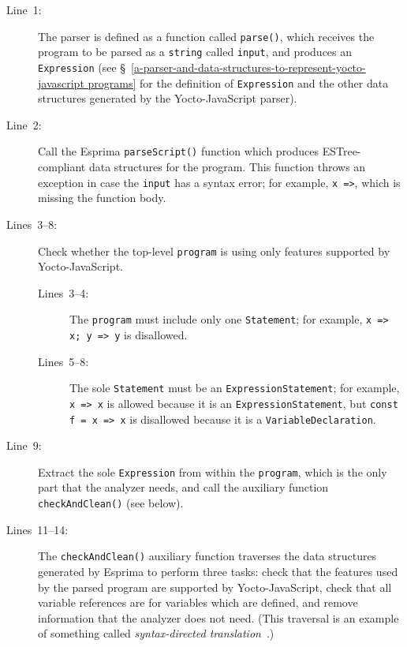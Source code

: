 \documentclass[12pt, oneside]{book}
\begin{document}
\begin{description}
\item [Line~1:]

The parser is defined as a function called \texttt{parse()}, which receives the program to be parsed as a \texttt{string} called \texttt{input}, and produces an \texttt{Expression} (see §~\ref{a-parser-and-data-structures-to-represent-yocto-javascript programs} for the definition of \texttt{Expression} and the other data structures generated by the Yocto-JavaScript parser).

\item [Line~2:]

Call the Esprima \texttt{parseScript()} function which produces ESTree-compliant data structures for the program. This function throws an exception in case the \texttt{input} has a syntax error; for example, \texttt{x =>}, which is missing the function body.

\item [Lines~3–8:]

Check whether the top-level \texttt{program} is using only features supported by Yocto-JavaScript.

\begin{description}
\item [Lines~3–4:]

The \texttt{program} must include only one \texttt{Statement}; for example, \texttt{x => x; y => y} is disallowed.

\item [Lines~5–8:]

The sole \texttt{Statement} must be an \texttt{ExpressionStatement}; for example, \texttt{x => x} is allowed because it is an \texttt{ExpressionStatement}, but \texttt{const f = x => x} is disallowed because it is a \texttt{VariableDeclaration}.
\end{description}

\item [Line~9:]

Extract the sole \texttt{Expression} from within the \texttt{program}, which is the only part that the analyzer needs, and call the auxiliary function \texttt{checkAndClean()} (see below).

\item [Lines~11–14:]

The \texttt{checkAndClean()} auxiliary function traverses the data structures generated by Esprima to perform three tasks: check that the features used by the parsed program are supported by Yocto-JavaScript, check that all variable references are for variables which are defined, and remove information that the analyzer does not need. (This traversal is an example of something called \emph{syntax-directed translation}~\cite[§~2]{dragon-book}.)


\end{description}
\end{document}
